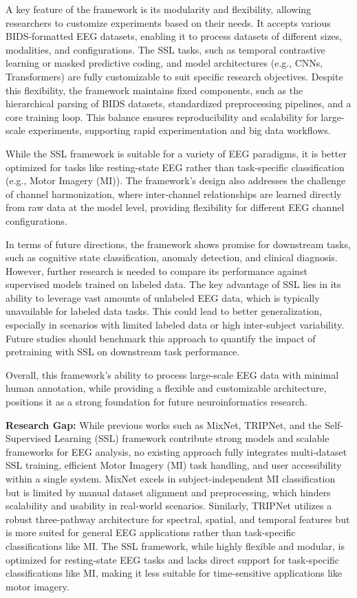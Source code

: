 A key feature of the framework is its modularity and flexibility, allowing researchers to customize experiments based on their needs. It accepts various BIDS-formatted EEG datasets, enabling it to process datasets of different sizes, modalities, and configurations. The SSL tasks, such as temporal contrastive learning or masked predictive coding, and model architectures (e.g., CNNs, Transformers) are fully customizable to suit specific research objectives. Despite this flexibility, the framework maintains fixed components, such as the hierarchical parsing of BIDS datasets, standardized preprocessing pipelines, and a core training loop. This balance ensures reproducibility and scalability for large-scale experiments, supporting rapid experimentation and big data workflows.

While the SSL framework is suitable for a variety of EEG paradigms, it is better optimized for tasks like resting-state EEG rather than task-specific classification (e.g., Motor Imagery (MI)). The framework’s design also addresses the challenge of channel harmonization, where inter-channel relationships are learned directly from raw data at the model level, providing flexibility for different EEG channel configurations.

In terms of future directions, the framework shows promise for downstream tasks, such as cognitive state classification, anomaly detection, and clinical diagnosis. However, further research is needed to compare its performance against supervised models trained on labeled data. The key advantage of SSL lies in its ability to leverage vast amounts of unlabeled EEG data, which is typically unavailable for labeled data tasks. This could lead to better generalization, especially in scenarios with limited labeled data or high inter-subject variability. Future studies should benchmark this approach to quantify the impact of pretraining with SSL on downstream task performance.

Overall, this framework’s ability to process large-scale EEG data with minimal human annotation, while providing a flexible and customizable architecture, positions it as a strong foundation for future neuroinformatics research.

\vspace{0.5em}
\newpage
\textbf{Research Gap:}
While previous works such as MixNet, TRIPNet, and the Self-Supervised Learning (SSL) framework contribute strong models and scalable frameworks for EEG analysis, no existing approach fully integrates multi-dataset SSL training, efficient Motor Imagery (MI) task handling, and user accessibility within a single system. MixNet excels in subject-independent MI classification but is limited by manual dataset alignment and preprocessing, which hinders scalability and usability in real-world scenarios. Similarly, TRIPNet utilizes a robust three-pathway architecture for spectral, spatial, and temporal features but is more suited for general EEG applications rather than task-specific classifications like MI. The SSL framework, while highly flexible and modular, is optimized for resting-state EEG tasks and lacks direct support for task-specific classifications like MI, making it less suitable for time-sensitive applications like motor imagery.


